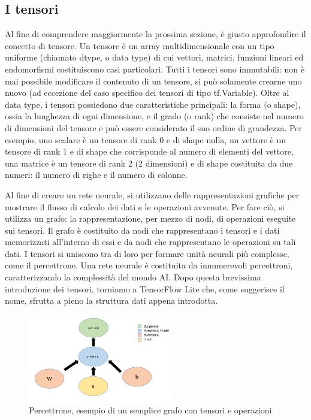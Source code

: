 \subsection{I tensori}
Al fine di comprendere maggiormente la prossima sezione, è giusto approfondire il concetto di tensore\cite{bladnreaprovino}. Un tensore è un array multidimensionale con un tipo uniforme (chiamato dtype, o data type) di cui vettori, matrici, funzioni
lineari ed endomorfismi costituiscono casi particolari. Tutti i tensori sono immutabili: non è mai possibile modificare il contenuto di un tensore, si può solamente crearne uno nuovo (ad eccezione del caso specifico dei tensori di tipo tf.Variable).
Oltre al data type, i tensori possiedono due caratteristiche principali: la forma (o shape), ossia la lunghezza di ogni dimensione, e il grado (o rank) che consiste nel numero di dimensioni del tensore e può essere considerato
il suo ordine di grandezza.
Per esempio, uno scalare è un tensore di rank 0 e di shape nulla, un vettore è un tensore di rank 1 e di shape che corrisponde al numero di elementi del vettore, una matrice è un tensore di rank 2 (2 dimensioni) e di shape costituita
da due numeri: il numero di righe e il numero di colonne.

Al fine di creare un rete neurale, si utilizzano delle rappresentazioni grafiche per mostrare il flusso di calcolo dei dati e le operazioni avvenute. Per fare ciò, si utilizza un grafo: la rappresentazione, per mezzo di nodi,
di operazioni eseguite sui tensori. Il grafo è costituito da nodi che rappresentano i tensori e i dati memorizzati all’interno di essi e da nodi che rappresentano le operazioni su tali dati. I tensori si uniscono tra di loro
per formare unità neurali più complesse, come il percettrone.
Una rete neurale è costituita da innumerevoli percettroni, caratterizzando la complessità del mondo AI. Dopo questa brevissima introduzione dei tensori, torniamo a TensorFlow Lite che, come suggerisce il nome, sfrutta a pieno
la struttura dati appena introdotta.

\begin{figure}[ht]
    \centering
    \includegraphics[width=0.57\textwidth]{Immagini/tensore.png}
    \caption{Percettrone, esempio di un semplice grafo con tensori e operazioni}
    \label{fig:tensore}
\end{figure}

